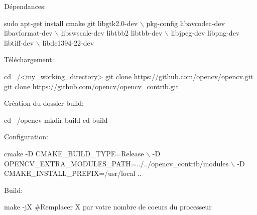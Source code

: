 \begin{DoxyEnumerate}
\item Dépendances\+:
\end{DoxyEnumerate}


\begin{DoxyCode}
sudo apt-get install cmake git libgtk2.0-dev \(\backslash\) 
pkg-config libavcodec-dev libavformat-dev \(\backslash\)
libswscale-dev libtbb2 libtbb-dev \(\backslash\)
libjpeg-dev libpng-dev libtiff-dev \(\backslash\)
libdc1394-22-dev
\end{DoxyCode}



\begin{DoxyEnumerate}
\item Téléchargement\+:
\end{DoxyEnumerate}


\begin{DoxyCode}
cd ~/<my\_working\_directory>
git clone https://github.com/opencv/opencv.git
git clone https://github.com/opencv/opencv\_contrib.git
\end{DoxyCode}



\begin{DoxyEnumerate}
\item Création du dossier build\+:
\end{DoxyEnumerate}


\begin{DoxyCode}
cd ~/opencv
mkdir build
cd build
\end{DoxyCode}



\begin{DoxyEnumerate}
\item Configuration\+:
\end{DoxyEnumerate}


\begin{DoxyCode}
cmake -D CMAKE\_BUILD\_TYPE=Release \(\backslash\)
-D OPENCV\_EXTRA\_MODULES\_PATH=../../opencv\_contrib/modules \(\backslash\)
-D CMAKE\_INSTALL\_PREFIX=/usr/local ..
\end{DoxyCode}



\begin{DoxyEnumerate}
\item Build\+:
\end{DoxyEnumerate}


\begin{DoxyCode}
make -jX #Remplacer X par votre nombre de coeurs du processeur
\end{DoxyCode}



